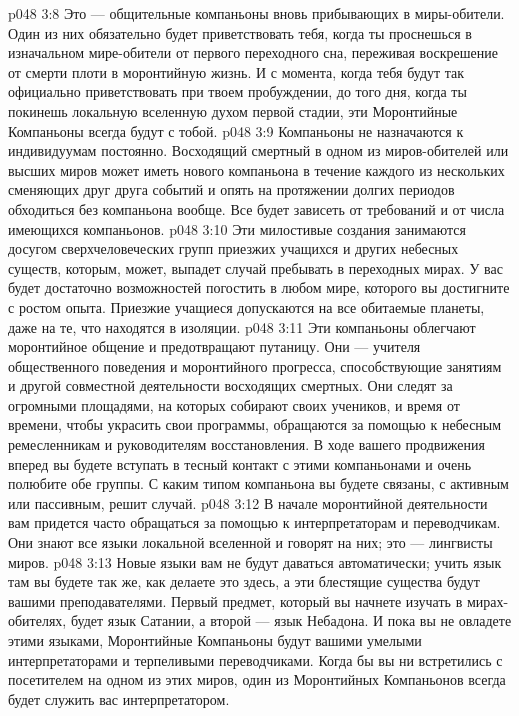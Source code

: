 \vs p048 3:8 \pc {}\bibnobreakspace {} Это --- общительные компаньоны вновь прибывающих в миры\hyp{}обители. Один из них обязательно будет приветствовать тебя, когда ты проснешься в изначальном мире\hyp{}обители от первого переходного сна, переживая воскрешение от смерти плоти в моронтийную жизнь. И с момента, когда тебя будут так официально приветствовать при твоем пробуждении, до того дня, когда ты покинешь локальную вселенную духом первой стадии, эти Моронтийные Компаньоны всегда будут с тобой.
\vs p048 3:9 Компаньоны не назначаются к индивидуумам постоянно. Восходящий смертный в одном из миров\hyp{}обителей или высших миров может иметь нового компаньона в течение каждого из нескольких сменяющих друг друга событий и опять на протяжении долгих периодов обходиться без компаньона вообще. Все будет зависеть от требований и от числа имеющихся компаньонов.
\vs p048 3:10 \pc {}\bibnobreakspace {} Эти милостивые создания занимаются досугом сверхчеловеческих групп приезжих учащихся и других небесных существ, которым, может, выпадет случай пребывать в переходных мирах. У вас будет достаточно возможностей погостить в любом мире, которого вы достигните с ростом опыта. Приезжие учащиеся допускаются на все обитаемые планеты, даже на те, что находятся в изоляции.
\vs p048 3:11 \pc {}\bibnobreakspace {} Эти компаньоны облегчают моронтийное общение и предотвращают путаницу. Они --- учителя общественного поведения и моронтийного прогресса, способствующие занятиям и другой совместной деятельности восходящих смертных. Они следят за огромными площадями, на которых собирают своих учеников, и время от времени, чтобы украсить свои программы, обращаются за помощью к небесным ремесленникам и руководителям восстановления. В ходе вашего продвижения вперед вы будете вступать в тесный контакт с этими компаньонами и очень полюбите обе группы. С каким типом компаньона вы будете связаны, с активным или пассивным, решит случай.
\vs p048 3:12 \pc {}\bibnobreakspace {} В начале моронтийной деятельности вам придется часто обращаться за помощью к интерпретаторам и переводчикам. Они знают все языки локальной вселенной и говорят на них; это --- лингвисты миров.
\vs p048 3:13 Новые языки вам не будут даваться автоматически; учить язык там вы будете так же, как делаете это здесь, а эти блестящие существа будут вашими преподавателями. Первый предмет, который вы начнете изучать в мирах\hyp{}обителях, будет язык Сатании, а второй --- язык Небадона. И пока вы не овладете этими языками, Моронтийные Компаньоны будут вашими умелыми интерпретаторами и терпеливыми переводчиками. Когда бы вы ни встретились с посетителем на одном из этих миров, один из Моронтийных Компаньонов всегда будет служить вас интерпретатором.
